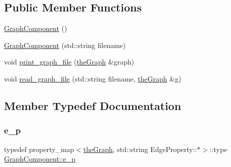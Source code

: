 \subsection*{Public Member Functions}
\begin{DoxyCompactItemize}
\item 
\hyperlink{class_graph_component_a35c4a6e5c6f28751b1bd6c451cc07957_a35c4a6e5c6f28751b1bd6c451cc07957}{Graph\+Component} ()
\item 
\hyperlink{class_graph_component_a14482fdab4e309677b4a14ab8db13079_a14482fdab4e309677b4a14ab8db13079}{Graph\+Component} (std\+::string filename)
\item 
void \hyperlink{class_graph_component_a6af293dac3774fde0e2822b5725ecacd_a6af293dac3774fde0e2822b5725ecacd}{print\+\_\+graph\+\_\+file} (\hyperlink{class_graph_component_a982e0748a6e1b8dc74986f5f8b3dca5c_a982e0748a6e1b8dc74986f5f8b3dca5c}{the\+Graph} \&graph)
\item 
void \hyperlink{class_graph_component_a680363eab8b992d739f055bd484bc000_a680363eab8b992d739f055bd484bc000}{read\+\_\+graph\+\_\+file} (std\+::string filename, \hyperlink{class_graph_component_a982e0748a6e1b8dc74986f5f8b3dca5c_a982e0748a6e1b8dc74986f5f8b3dca5c}{the\+Graph} \&g)
\end{DoxyCompactItemize}


\subsection{Member Typedef Documentation}
\mbox{\label{class_graph_component_a22292bf7520fb476958c508d66f5d318_a22292bf7520fb476958c508d66f5d318}} 
\subsubsection{\texorpdfstring{e\+\_\+p}{e\_p}}
{\footnotesize\ttfamily typedef property\+\_\+map$<$\hyperlink{class_graph_component_a982e0748a6e1b8dc74986f5f8b3dca5c_a982e0748a6e1b8dc74986f5f8b3dca5c}{the\+Graph}, std\+::string Edge\+Property\+::$\ast$$>$\+::type \hyperlink{class_graph_component_a22292bf7520fb476958c508d66f5d318_a22292bf7520fb476958c508d66f5d318}{Graph\+Component\+::e\+\_\+p}}

\mbox{\label{class_graph_component_aa7517b2af08aa717324076a645c73fe6_aa7517b2af08aa717324076a645c73fe6}} 
